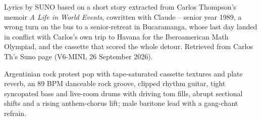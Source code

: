 
\begin{notes}
Lyrics by SUNO based on a short story extracted from Carlos Thompson's memoir \emph{A Life in World Events}, cowritten with Claude -- senior year 1989, a wrong turn on the bus to a senior-retreat in Bucaramanga, whose last day landed in conflict with Carlos's own trip to Havana for the Iberoamerican Math Olympiad, and the cassette that scored the whole detour. Retrieved from Carlos Th's Suno page (V6-MINI, 26 September 2026).
\end{notes}
\begin{style}
Argentinian rock protest pop with tape-saturated cassette textures and plate reverb, an 89 BPM danceable rock groove, clipped rhythm guitar, tight syncopated bass and live-room drums with driving tom fills, abrupt sectional shifts and a rising anthem-chorus lift; male baritone lead with a gang-chant refrain.
\end{style}
